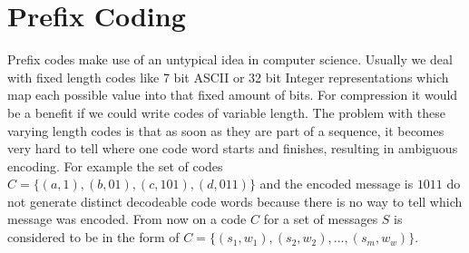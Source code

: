 \section{Prefix Coding}
\label{ch:Principles of compression:sec:Huffman Coding}
\par{
Prefix codes make use of an untypical idea in computer science. Usually we deal with fixed length codes like 7 bit ASCII or 32 bit Integer representations which map each possible value into that fixed amount of bits. For compression it would be a benefit if we could write codes of variable length. The problem with these varying length codes is that as soon as they are part of a sequence, it becomes very hard to tell where one code word starts and finishes, resulting in ambiguous encoding. For example the set of codes $ C= \{(a,1),(b,01),(c,101),(d,011)\}$ and the encoded message is $1011$ do not generate distinct decodeable code words because there is no way to tell which message was encoded. From now on a code $C$ for a set of messages $S$ is considered to be in the form of $ C= \{(s_1,w_1),(s_2,w_2),...,(s_m,w_w)\}$.
}
